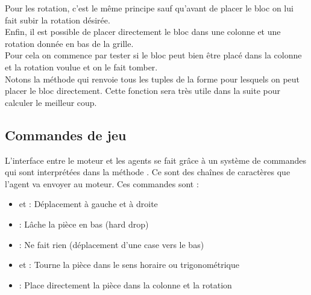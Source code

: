 Pour les rotation, c'est le même principe sauf qu'avant de placer le bloc on lui fait subir la rotation désirée.\\

Enfin, il est possible de placer directement le bloc dans une colonne et une rotation donnée en bas de la grille.\\
Pour cela on commence par tester si le bloc peut bien être placé dans la colonne et la rotation voulue et on le fait tomber.\\
Notons la méthode  qui renvoie tous les tuples de la forme  pour lesquels on peut placer le bloc directement. Cette fonction sera très utile dans la suite pour calculer le meilleur coup.

\subsection{Commandes de jeu}
L'interface entre le moteur et les agents se fait grâce à un système de commandes qui sont interprétées dans la méthode . Ce sont des chaînes de caractères que l'agent va envoyer au moteur. Ces commandes sont :
\begin{itemize}
	\item {} et  : Déplacement à gauche et à droite
	\item {} : Lâche la pièce en bas (hard drop)
	\item {} : Ne fait rien (déplacement d'une case vers le bas)
	\item {} et  : Tourne la pièce dans le sens horaire ou trigonométrique
	\item {} : Place directement la pièce dans la colonne  et la rotation 
\end{itemize}

